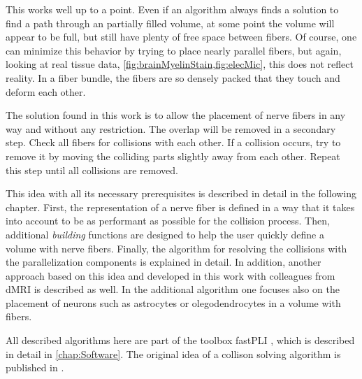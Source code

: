 This works well up to a point.
Even if an algorithm always finds a solution to find a path through an partially filled volume, at some point the volume will appear to be full, but still have plenty of free space between fibers.
Of course, one can minimize this behavior by trying to place nearly parallel fibers, but again, looking at real tissue data, \eg{} \cref{fig:brainMyelinStain,fig:elecMic}, this does not reflect reality.
In a fiber bundle, the fibers are so densely packed that they touch and deform each other.
\par
%
The solution found in this work is to allow the placement of nerve fibers in any way and without any restriction.
The overlap will be removed in a secondary step.
Check all fibers for collisions with each other.
If a collision occurs, try to remove it by moving the colliding parts slightly away from each other.
Repeat this step until all collisions are removed.
\par
%
This idea with all its necessary prerequisites is described in detail in the following chapter.
First, the representation of a nerve fiber is defined in a way that it takes into account to be as performant as possible for the collision process.
Then, additional \textit{building} functions are designed to help the user quickly define a volume with nerve fibers.
Finally, the algorithm for resolving the collisions with the parallelization components is explained in detail.
In addition, another approach based on this idea and developed in this work with colleagues from \ac{dMRI} is described as well.
In the additional algorithm one focuses also on the placement of neurons such as astrocytes or olegodendrocytes in a volume with fibers.
\par
%
All described algorithms here are part of the toolbox \ac{fastPLI} \cite{Matuschke2019, Matuschke2021}, which is described in detail in \cref{chap:Software}.
The original idea of a collison solving algorithm is published in \cite{Matuschke2019}.
%
%
%
